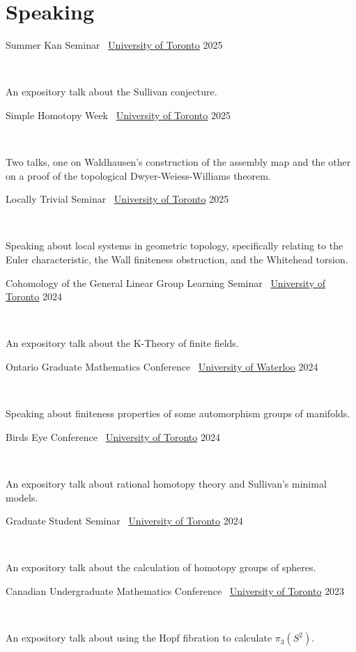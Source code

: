 \documentclass[]{style}
\begin{document}
\section{Speaking}

\begin{entrylist}

\vspace{1mm}

\entry
{Summer Kan Seminar \ {\normalfont \underline{University of Toronto}}}
{2025}
{ ~ \vspace{-2.5mm}

An expository talk about the Sullivan conjecture.}

\entry
{Simple Homotopy Week \ {\normalfont \underline{University of Toronto}}}
{2025}
{ ~ \vspace{-2.5mm}

Two talks, one on Waldhausen's construction of the assembly map and the other on a proof of the topological Dwyer-Weiess-Williams theorem.}

\entry
{Locally Trivial Seminar \ {\normalfont \underline{University of Toronto}}}
{2025}
{ ~ \vspace{-2.5mm}

Speaking about local systems in geometric topology, specifically relating to the Euler characteristic, the Wall finiteness obstruction, and the Whitehead torsion.}

\entry
{Cohomology of the General Linear Group Learning Seminar \ {\normalfont \underline{University of Toronto}}}
{2024}
{ ~ \vspace{-2.5mm}

An expository talk about the K-Theory of finite fields.}

\entry
{Ontario Graduate Mathematics Conference \ {\normalfont \underline{University of Waterloo}}}
{2024}
{ ~ \vspace{-2.5mm}

Speaking about finiteness properties of some automorphism groups of manifolds.}

\entry
{Birds Eye Conference \ {\normalfont \underline{University of Toronto}}}
{2024}
{ ~ \vspace{-2.5mm}

An expository talk about rational homotopy theory and Sullivan's minimal models.}

\entry
{Graduate Student Seminar \ {\normalfont \underline{University of Toronto}}}
{2024}
{ ~ \vspace{-2.5mm}

An expository talk about the calculation of homotopy groups of spheres.}

\entry
{Canadian Undergraduate Mathematics Conference \ {\normalfont \underline{University of Toronto}}}
{2023}
{ ~ \vspace{-2.5mm}

An expository talk about using the Hopf fibration to calculate $\pi_3(S^2)$.}

\end{entrylist}
\end{document}
